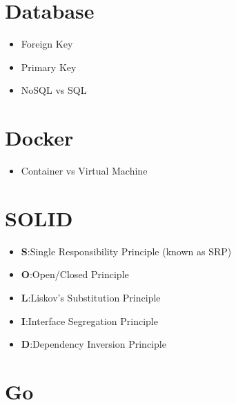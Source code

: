 \documentclass[]{book}
\begin{document}
\section{Database}

\begin{itemize}
  \item Foreign Key
  \item Primary Key
  \item NoSQL vs SQL
\end{itemize}

\section{Docker}

\begin{itemize}
  \item Container vs Virtual Machine
\end{itemize}

\section{SOLID}

\begin{itemize}
  \item \textbf{S}:\@ Single Responsibility Principle (known as SRP)
  \item \textbf{O}:\@ Open/Closed Principle
  \item \textbf{L}:\@ Liskov’s Substitution Principle
  \item \textbf{I}:\@ Interface Segregation Principle
  \item \textbf{D}:\@ Dependency Inversion Principle
\end{itemize}

\section{Go}
\end{document}
